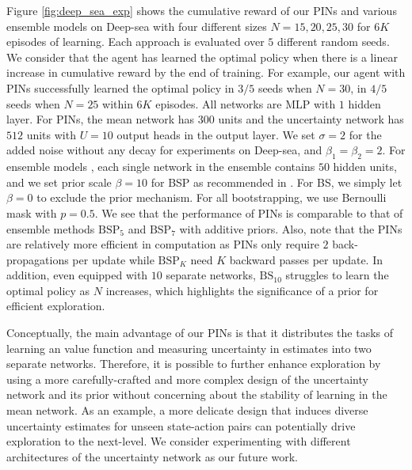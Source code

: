 \documentclass[letterpaper]{article} %
\theoremstyle{definition}
\begin{document}
Figure \ref{fig:deep_sea_exp} shows the cumulative reward of our PINs and various ensemble models on Deep-sea with four different sizes $N = 15, 20, 25, 30$ for $6K$ episodes of learning. Each approach is evaluated over $5$ different random seeds. We consider that the agent has learned the optimal policy when there is a linear increase in cumulative reward by the end of training. For example, our agent with PINs successfully learned the optimal policy in $3/5$ seeds when $N = 30$, in $4/5$ seeds when $N = 25$ within $6K$ episodes. All networks are MLP with $1$ hidden layer. For PINs, the mean network has $300$ units and the uncertainty network has $512$ units with $U=10$ output heads in the output layer. We set $\sigma = 2$ for the added noise without any decay for experiments on Deep-sea, and $\beta_1 = \beta_2 = 2$. For ensemble models \cite{osband2018randomized}, each single network in the ensemble contains $50$ hidden units, and we set prior scale $\beta=10$ for BSP as recommended in \cite{osband2018randomized}. For BS, we simply let $\beta=0$ to exclude the prior mechanism. For all bootstrapping, we use Bernoulli mask with $p = 0.5$. We see that the performance of PINs is comparable to that of ensemble methods $\mathrm{BSP}_5$ and $\mathrm{BSP}_7$ with additive priors. Also, note that the PINs are relatively more efficient in computation as PINs only require $2$ back-propagations per update while $\mathrm{BSP}_K$ need $K$ backward passes per update. In addition, even equipped with $10$ separate networks, $\mathrm{BS}_{10}$ struggles to learn the optimal policy as $N$ increases, which highlights the significance of a prior for efficient exploration.

Conceptually, the main advantage of our PINs is that it distributes the tasks of learning an value function and measuring uncertainty in estimates into two separate networks. Therefore, it is possible to further enhance exploration by using a more carefully-crafted and more complex design of the uncertainty network and its prior without concerning about the stability of learning in the mean network. As an example, a more delicate design that induces diverse uncertainty estimates for unseen state-action pairs can potentially drive exploration to the next-level. We consider experimenting with different architectures of the uncertainty network as our future work.
\end{document}
